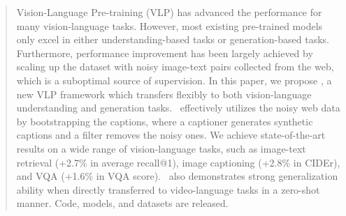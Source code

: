 \begin{abstract}
 Vision-Language Pre-training (VLP) has advanced the performance for many vision-language tasks.
 However,
 most existing pre-trained models only excel in either understanding-based tasks or generation-based tasks.
 Furthermore,
 performance improvement has been largely achieved by scaling up the dataset with noisy image-text pairs collected from the web,
 which is a suboptimal source of supervision.
 In this paper,
 we propose \name,
 a new VLP framework which transfers flexibly to both vision-language understanding and generation tasks.
 \name~effectively utilizes the noisy web data by bootstrapping the captions, where a captioner generates synthetic captions and a filter removes the noisy ones.
 We achieve state-of-the-art results on a wide range of vision-language tasks,
 such as image-text retrieval (+2.7\% in average recall@1), image captioning (+2.8\% in CIDEr),
 and VQA (+1.6\% in VQA score).
 \name~also demonstrates strong generalization ability when directly transferred to video-language tasks in a zero-shot manner.
 Code, models, and datasets are released.

\end{abstract} 